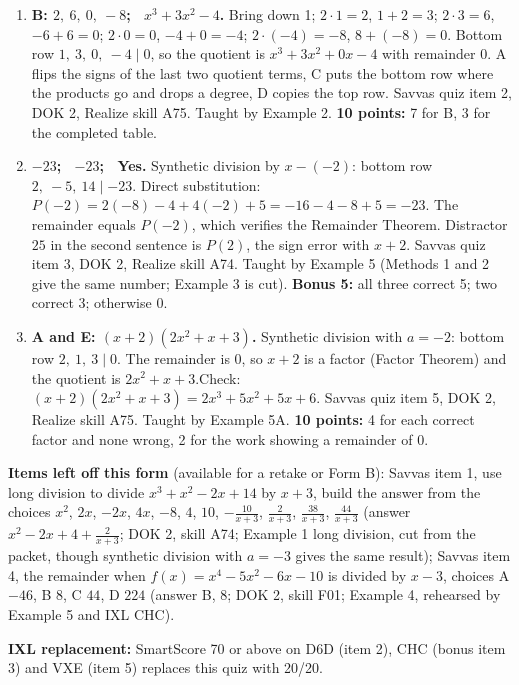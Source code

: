 \documentclass[11pt]{article}
\begin{document}
\begin{enumerate}
\item[\textbf{2.}] \textbf{B: $2,\ 6,\ 0,\ -8$; \ $x^3+3x^2-4$.} Bring down 1; $2\cdot1=2$, $1+2=3$; $2\cdot3=6$, $-6+6=0$; $2\cdot0=0$, $-4+0=-4$; $2\cdot(-4)=-8$, $8+(-8)=0$. Bottom row $1,\ 3,\ 0,\ -4 \mid 0$, so the quotient is $x^3+3x^2+0x-4$ with remainder $0$. A flips the signs of the last two quotient terms, C puts the bottom row where the products go and drops a degree, D copies the top row. Savvas quiz item 2, DOK 2, Realize skill A75. Taught by Example 2. \textbf{10 points:} 7 for B, 3 for the completed table.
\item[\textbf{3.}] \textbf{$-23$; \ $-23$; \ Yes.} Synthetic division by $x-(-2)$: bottom row $2,\ -5,\ 14 \mid -23$. Direct substitution: $P(-2)=2(-8)-4+4(-2)+5=-16-4-8+5=-23$. The remainder equals $P(-2)$, which verifies the Remainder Theorem. Distractor $25$ in the second sentence is $P(2)$, the sign error with $x+2$. Savvas quiz item 3, DOK 2, Realize skill A74. Taught by Example 5 (Methods 1 and 2 give the same number; Example 3 is cut). \textbf{Bonus 5:} all three correct 5; two correct 3; otherwise 0.
\item[\textbf{5.}] \textbf{A and E: $(x+2)(2x^2+x+3)$.} Synthetic division with $a=-2$: bottom row $2,\ 1,\ 3 \mid 0$. The remainder is $0$, so $x+2$ is a factor (Factor Theorem) and the quotient is $2x^2+x+3$.\newline Check: \mbox{$(x+2)(2x^2+x+3)=2x^3+5x^2+5x+6$}. Savvas quiz item 5, DOK 2, Realize skill A75. Taught by Example 5A. \textbf{10 points:} 4 for each correct factor and none wrong, 2 for the work showing a remainder of $0$.
\end{enumerate}

\textbf{Items left off this form} (available for a retake or Form B): Savvas item 1, use long division to divide $x^3+x^2-2x+14$ by $x+3$, build the answer from the choices $x^2$, $2x$, $-2x$, $4x$, $-8$, $4$, $10$, $-\frac{10}{x+3}$, $\frac{2}{x+3}$, $\frac{38}{x+3}$, $\frac{44}{x+3}$ (answer $x^2-2x+4+\frac{2}{x+3}$; DOK 2, skill A74; Example 1 long division, cut from the packet, though synthetic division with $a=-3$ gives the same result); Savvas item 4, the remainder when $f(x)=x^4-5x^2-6x-10$ is divided by $x-3$, choices A $-46$, B $8$, C $44$, D $224$ (answer B, $8$; DOK 2, skill F01; Example 4, rehearsed by Example 5 and IXL CHC).

\textbf{IXL replacement:} SmartScore 70 or above on D6D (item 2), CHC (bonus item 3) and VXE (item 5) replaces this quiz with 20/20.
\end{document}
